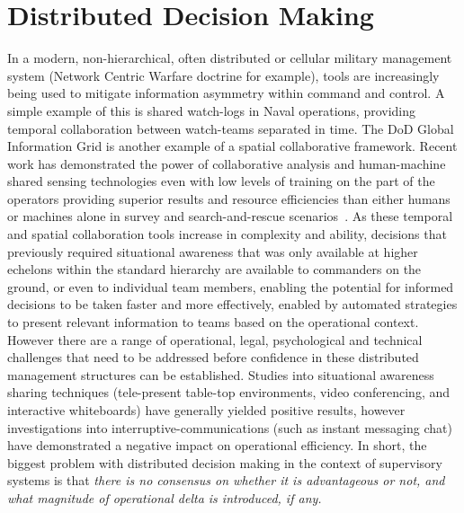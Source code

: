 \section{Distributed Decision Making}
In a modern, non-hierarchical, often distributed or cellular military management system (Network Centric Warfare doctrine for example), tools are increasingly being used to mitigate information asymmetry within command and control.
A simple example of this is shared watch-logs in Naval operations, providing temporal collaboration between watch-teams separated in time.
The DoD Global Information Grid is another example of a spatial collaborative framework.
Recent work has demonstrated the power of collaborative analysis and human-machine shared sensing technologies even with low levels of training on the part of the operators providing superior results and resource efficiencies than either humans or machines alone in survey and search-and-rescue scenarios~\cite{Ahmed2014}.
As these temporal and spatial collaboration tools increase in complexity and ability, decisions that previously required situational awareness that was only available at higher echelons within the standard hierarchy are available to commanders on the ground, or even to individual team members, enabling the potential for informed decisions to be taken faster and more effectively, enabled by automated strategies to present relevant information to teams based on the operational context.
However there are a range of operational, legal, psychological and technical challenges that need to be addressed before confidence in these distributed management structures can be established.
Studies into situational awareness sharing techniques (tele-present table-top environments, video conferencing, and interactive whiteboards) have generally yielded positive results, however investigations into interruptive-communications (such as instant messaging chat) have demonstrated a negative impact on operational efficiency.
In short, the biggest problem with distributed decision making in the context of supervisory systems is that \textit{there is no consensus on whether it is advantageous or not, and what magnitude of operational delta is introduced, if any.}

